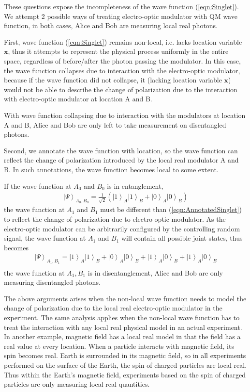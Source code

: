 \documentclass[prd,showpacs,twocolumn]{revtex4-1}
\begin{document}
These questions expose the incompleteness of the wave function (\ref{eqn:Singlet}). We attempt 2 possible ways of treating electro-optic modulator with QM wave function, in both cases, Alice and Bob are measuring local real photons.

First, wave function (\ref{eqn:Singlet}) remains non-local, i.e. lacks location variable $\mathbf x$, thus it attempts to represent the physical process uniformly in the entire space, regardless of before/after the photon passing the modulator. In this case, the wave function collapses due to interaction with the electro-optic modulator, because if the wave function did not collapse, it (lacking location variable $\mathbf x$) would not be able to describe the change of polarization due to the interaction with electro-optic modulator at location A and B.

With wave function collapsing due to interaction with the modulators at location A and B, Alice and Bob are only left to take measurement on disentangled photons.

Second, we annotate the wave function with location, so the wave function can reflect the change of polarization introduced by the local real modulator A and B. In such annotations, the wave function becomes local to some extent.

If the wave function at $A_0$ and $B_0$ is in entanglement,
\begin{eqnarray}
\left| \Psi\right >_{A_0, B_0}=\frac{1}{\sqrt{2}}(\left| 1\right>_A\left| 1\right>_B+\left| 0\right>_A\left| 0\right>_B)
\label{eqn:AnnotatedSinglet}
\end{eqnarray}
the wave function at $A_1$ and $B_1$ must be different than (\ref{eqn:AnnotatedSinglet}) to reflect the change of polarization due to electro-optic modulator. As the electro-optic modulator can be arbitrarily configured by the controlling random signal, the wave function at $A_1$ and $B_1$ will contain all possible joint states, thus becomes
\begin{eqnarray}
\left| \Psi\right >_{A_1, B_1}=\left| 1\right>_A\left| 1\right>_B+\left| 0\right>_A\left| 0\right>_B + \left| 1\right>_A\left| 0\right>_B+\left| 1\right>_A\left| 0\right>_B\nonumber\\
\label{eqn:Disturbed}
\end{eqnarray}
the wave function at $A_1, B_1$ is in disentanglement, Alice and Bob are only measuring disentangled photons.

The above arguments arises when the non-local wave function needs to model the change of polarization due to the local real electro-optic modulator in the experiment. The same analysis applies when the non-local wave function has to treat the interaction with any local real physical model in an actual experiment. In another example, magnetic field has a local real model in that the field has a real value at every location. When a particle interacts with magnetic field, its spin becomes real. Earth is surrounded in its magnetic field, so in all experiments performed on the surface of the Earth, the spin of charged particles are local real. Thus within the Earth's magnetic field, experiments based on the spin of charged particles are only measuring local real quantities.
\end{document}
